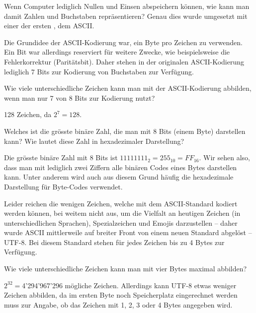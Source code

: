 Wenn Computer lediglich Nullen und Einsen abspeichern können, wie kann man damit Zahlen und Buchstaben repräsentieren? Genau dies wurde umgesetzt mit einer der ersten , dem \gls{ASCII}.

Die Grundidee der \gls{ASCII}-Kodierung war, ein Byte pro Zeichen zu verwenden. Ein Bit war allerdings reserviert für weitere Zwecke, wie beispielsweise die Fehlerkorrektur (Paritätsbit). Daher stehen in der originalen ASCII-Kodierung lediglich 7 Bits zur Kodierung von Buchstaben zur Verfügung.

\begin{myexercise}
	Wie viele unterschiedliche Zeichen kann man mit der ASCII-Kodierung abbilden, wenn man nur 7 von 8 Bits zur Kodierung nutzt?
	\begin{myanswer}
		128 Zeichen, da $2^7=128$.
	\end{myanswer}
\end{myexercise}
\begin{myexercise}
	Welches ist die grösste binäre Zahl, die man mit 8 Bits (einem Byte) darstellen kann? Wie lautet diese Zahl in hexadezimaler Darstellung?
	\begin{myanswer}
		Die grösste binäre Zahl mit 8 Bits ist $11111111_2 = 255_{10} = FF_{16}$. Wir sehen also, dass man mit lediglich zwei Ziffern alle binären Codes eines Bytes darstellen kann. Unter anderem wird auch aus diesem Grund häufig die hexadezimale Darstellung für Byte-Codes verwendet.
	\end{myanswer}
\end{myexercise}

Leider reichen die wenigen Zeichen, welche mit dem \gls{ASCII}-Standard kodiert werden können, bei weitem nicht aus, um die Vielfalt an heutigen Zeichen (in unterschiedlichen Sprachen), Spezialzeichen und Emojis darzustellen -- daher wurde \gls{ASCII} mittlerweile auf breiter Front von einem neuen Standard abgelöst -- \gls{UTF-8}. Bei diesem Standard stehen für jedes Zeichen bis zu 4 Bytes zur Verfügung.
\begin{myexercise}
	Wie viele unterschiedliche Zeichen kann man mit vier Bytes maximal abbilden?
	\begin{myanswer}
		$2^{32}=$4'294'967'296 mögliche Zeichen. Allerdings kann UTF-8 etwas weniger Zeichen abbilden, da im ersten Byte noch Speicherplatz eingerechnet werden muss zur Angabe, ob das Zeichen mit 1, 2, 3 oder 4 Bytes angegeben wird.
	\end{myanswer}
\end{myexercise}



